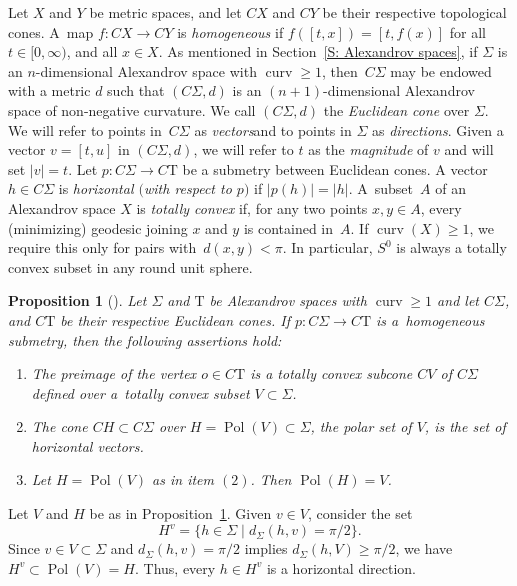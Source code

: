 \documentclass[pdftex]{sigma}
\numberwithin{equation}{section}
\newtheorem{prop}[thm]{Proposition}
\theoremstyle{definition}
\DeclareMathOperator{\curv}{curv}
\DeclareMathOperator{\Pol}{Pol}
\newcommand{\Sp}{S} %
\newcommand{\Tau}{\mathrm{T}}
\begin{document}
Let $X$ and $Y$ be metric spaces, and let $CX$ and $CY$ be their respective topological cones. A~map $f\colon CX\to CY$ is \emph{homogeneous} if
$
	f([t,x]) = [t,f(x)]
$
for all $t\in [0,\infty)$, and all $x\in X$. As mentioned in Section~\ref{S: Alexandrov spaces}, if $\Sigma$ is an $n$-dimensional Alexandrov space with $\curv\geq 1$, then~$C\Sigma$ may be endowed with a metric $d$ such that $(C\Sigma,d)$ is an $(n+1)$-dimensional Alexandrov space of non-negative curvature. We call $(C\Sigma,d)$ the \emph{Euclidean cone} over $\Sigma$. We will refer to points in~$C\Sigma$ as \emph{vectors}and to points in $\Sigma$ as \emph{directions}.
Given a vector $v=[t,u]$ in $(C\Sigma,d)$, we will refer to $t$ as the \emph{magnitude} of $v$ 	and will set $|v| = t$. Let $p\colon C\Sigma \to C\Tau$ be a submetry between Euclidean cones. A vector $h\in C\Sigma$ is \emph{horizontal $($with respect to $p)$} if $|p(h)| = |h|$.
 A~subset~$A$ of an Alexandrov space $X$ is \emph{totally convex} if, for any two points $x,y\in A$, every (minimizing) geodesic joining $x$ and $y$ is contained in~$A$. If $\curv(X)\geq 1$, we require this only for pairs with~$d(x,y)<\pi$. In particular, $\Sp^0$ is always a totally convex subset in any round unit sphere.
	
\begin{prop}[]
		\label{P: Horizontal and Vertical spaces of space of directions of submetry}
Let $\Sigma$ and $\Tau$ be Alexandrov spaces with $\curv\geq 1$ and let $C\Sigma$, and $C\Tau$ be their respective Euclidean cones. If $p\colon C\Sigma\to C\Tau$ is a~homogeneous submetry, then the following assertions hold:
\begin{enumerate}\itemsep=0pt
	\item[$(1)$] The preimage of the vertex $o\in C\Tau$ is a totally convex subcone $CV$ of $C\Sigma$ defined over a~totally convex subset $V\subset \Sigma$.
	\item[$(2)$] The cone $CH\subset C\Sigma$ over $H = \Pol(V)\subset \Sigma$, the polar set of $V$, is the set of horizontal vectors.
	\item[$(3)$] Let $H=\Pol(V)$ as in item $(2)$. Then $\Pol(H)=V$.
\end{enumerate}
\end{prop}

Let $V$ and $H$ be as in Proposition~\ref{P: Horizontal and Vertical spaces of space of directions of submetry}. %
Given $v\in V$, consider the set
\[
	H^v = \{h\in \Sigma \mid d_{\Sigma}(h,v) = \pi/2\}. %
\]
Since $v\in V\subset\Sigma$ and $d_\Sigma(h,v)=\pi/2$ implies $d_\Sigma(h,V)\ge\pi/2$,
we have $H^v\subset \Pol(V)=H$. Thus, every $h\in H^v$ is a horizontal direction.
\end{document}
